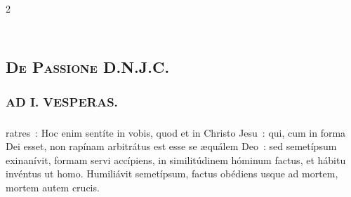 \documentclass[9pt,twoside]{extarticle}
\begin{document}
\begin{multicols}{2}
{{{\subsection*{\center {}}
\subsection*{\center \textsc{\\ De Passione D.N.J.C.}}
\subsubsection*{\center {}}

\subsubsection*{\center \textsc{AD I. VESPERAS.}}
\subsubsection*{}
ratres~: Hoc enim sentíte in vobis, quod et in Christo Jesu~: qui, cum in forma Dei esset, non rapínam arbitrátus est esse se æquálem Deo~: sed semetípsum exinanívit, formam servi accípiens, in similitúdinem hóminum factus, et hábitu invéntus ut homo. Humiliávit semetípsum, factus obédiens usque ad mortem, mortem autem crucis.

}}}
\end{multicols}
\end{document}
